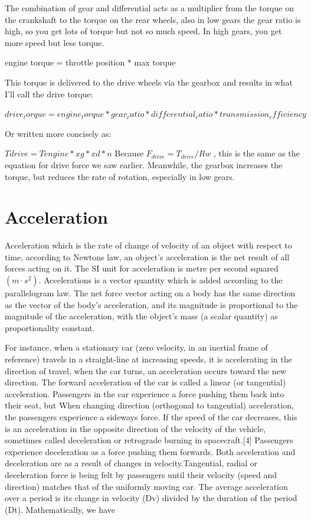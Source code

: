\documentclass{book}
\begin{document}
The combination of gear and differential acts as a multiplier from the torque on the crankshaft to the torque on the rear wheels, also in low gears the gear ratio is high, so you get lots of torque but not so much speed. In high gears, you get more speed but less torque.

engine torque = throttle position * max torque

This torque is delivered to the drive wheels via the gearbox and results in what I'll call the drive torque:

    $ drive_torque = engine_torque * gear_ratio * differential_ratio * transmission_efficiency $

Or written more concisely as:

   $ Tdrive =  Tengine * xg * xd * n $
Because $F_{drive} = T_{drive} / Rw $ , this is the same as the equation for drive force we saw earlier. Meanwhile, the gearbox increases the torque, but reduces the rate of rotation, especially in low gears.


\section{Acceleration}
Acceleration which is the rate of change of velocity of an object with respect to time, according to Newtons law, an object's acceleration is the net result of all forces acting on it.
The SI unit for acceleration is metre per second squared $(m \cdot s^2)$. Accelerations is a  vector quantity which is added according to the parallelogram law. The net force vector acting on a body has the same direction as the vector of the body's acceleration, and its magnitude is proportional to the magnitude of the acceleration, with the object's mass (a scalar quantity) as proportionality constant.

For instance, when a stationary car (zero velocity, in an inertial frame of reference) travels in a straight-line at increasing speeds, it is accelerating in the direction of travel, when the car turns, an acceleration occurs toward the new direction. The forward acceleration of the car is called a linear (or tangential) acceleration. Passengers in the car experience a force pushing them back into their seat, but When changing direction (orthogonal to tangential) acceleration, the passengers experience a sideways force. If the speed of the car decreases, this is an acceleration in the opposite direction of the velocity of the vehicle, sometimes called deceleration or retrograde burning in spacecraft.[4] Passengers experience  deceleration as a force pushing them forwards. Both acceleration and deceleration are as a result of changes in velocity.Tangential, radial or deceleration force is being felt by passengers until their velocity (speed and direction) matches that of the uniformly moving car.
The average acceleration over a period is its change in velocity (Dv) divided by the duration of the period (Dt).  Mathematically, we have
\end{document}
